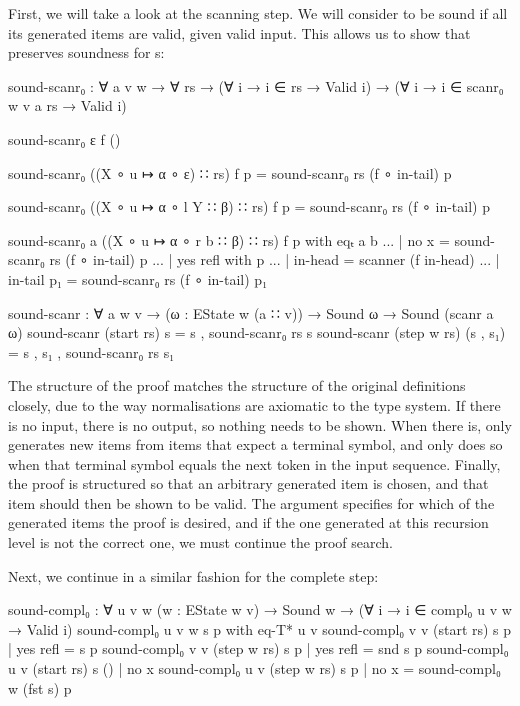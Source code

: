 		First, we will take a look at the scanning step. We will consider
		 to be sound if all its generated items are valid, given
		valid input. This allows us to show that  preserves
		soundness for s:

		\begin{code}
			  sound-scanr₀ : ∀ {a v w} → ∀ rs →
			    (∀ {i} → i ∈ rs → Valid i) →
			    (∀ {i} → i ∈ scanr₀ {w} {v} a rs → Valid i)
			
			  sound-scanr₀ ε f ()
			  
			  sound-scanr₀ ((X ∘ u ↦ α ∘ ε) ∷ rs) f p = 
			    sound-scanr₀ rs (f ∘ in-tail) p
			
			  sound-scanr₀ ((X ∘ u ↦ α ∘ l Y ∷ β) ∷ rs) f p = 
			    sound-scanr₀ rs (f ∘ in-tail) p
			
			  sound-scanr₀ {a} ((X ∘ u ↦ α ∘ r b ∷ β) ∷ rs) f p with eqₜ a b
			  ... | no x = sound-scanr₀ rs (f ∘ in-tail) p
			  ... | yes refl with p
			  ...            | in-head    = scanner (f in-head)
			  ...            | in-tail p₁ = sound-scanr₀ rs (f ∘ in-tail) p₁
			
			  sound-scanr : ∀ {a w v} → (ω : EState w (a ∷ v)) →
			    Sound ω → Sound (scanr a ω)
			  sound-scanr (start rs) s = s , sound-scanr₀ rs s
			  sound-scanr (step w rs) (s , s₁) = s , s₁ , sound-scanr₀ rs s₁
		\end{code}

		The structure of the proof matches the structure of the original
		definitions closely, due to the way normalisations are axiomatic to the
		type system. If there is no input, there is no output, so nothing needs
		to be shown. When there is,  only generates new items
		from items that expect a terminal symbol, and only does so when that
		terminal symbol equals the next token in the input sequence. Finally,
		the proof is structured so that an arbitrary generated item is chosen,
		and that item should then be shown to be valid. The argument 
		specifies for which of the generated items the proof is desired, and if
		the one generated at this recursion level is not the correct one, we
		must continue the proof search.

		Next, we continue in a similar fashion for the complete step:

		\begin{code}
			  sound-compl₀ : ∀ {u v w} (w : EState w v) →
			    Sound w → (∀ {i} → i ∈ compl₀ {u} {v} w → Valid i)
			  sound-compl₀ {u} {v} w s p           with eq-T* u v
			  sound-compl₀ {v} {v} (start rs) s p  | yes refl = s p
			  sound-compl₀ {v} {v} (step w rs) s p | yes refl = snd s p
			  sound-compl₀ {u} {v} (start rs) s () | no x
			  sound-compl₀ {u} {v} (step w rs) s p | no x = sound-compl₀ w (fst s) p
		\end{code}

